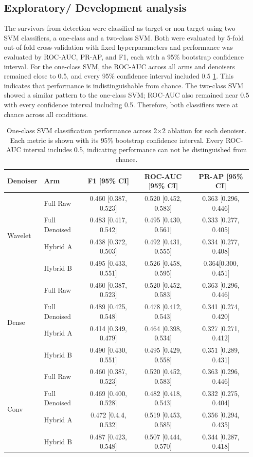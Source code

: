 \documentclass[ %
                    author={Daniel Page},
                supervisor={Dr. Andrew Calway},
                    degree={MSc},
                     title={Some Structural Guidelines for Data Science MSc Theses, Including Those With Long Titles that Run Across Multiple Lines on the Front Page},
                  subtitle={And those including an optional subtitle too, for good measure},
                      type={},
                      year={2021}]{dissertation}
\begin{document}
\subsection{Exploratory/ Development analysis}
The survivors from detection were classified as target or non-target using two SVM classifiers, a one-class and a two-class SVM. Both were evaluated by 5-fold out-of-fold cross-validation with fixed hyperparameters and performance was evaluated by ROC-AUC, PR-AP, and F1, each with a 95\% bootstrap confidence interval.  
For the one-class SVM, the ROC-AUC across all arms and denoisers remained close to 0.5, and every 95\% confidence interval included 0.5 \ref{tab:oneclass-cis}. This indicates that performance is indistinguishable from chance. 
The two-class SVM showed a similar pattern to the one-class SVM; ROC-AUC also remained near 0.5 with every confidence interval including 0.5. Therefore, both classifiers were at chance across all conditions. 
\begin{table}[htbp]
    \centering
    \small
    \begin{tabular}{llccc}
    \toprule
    Denoiser  & Arm & F1 [95\% CI] & ROC-AUC [95\% CI] & PR-AP [95\% CI] \\
    \midrule
    \multirow{4}{*}{Wavelet}
    & Full Raw & 0.460 [0.387, 0.523] & 0.520 [0.452, 0.583] & 0.363 [0.296, 0.446] \\
    & Full Denoised & 0.483 [0.417, 0.542] & 0.495 [0.430, 0.561] & 0.333 [0.277, 0.405] \\
    & Hybrid A & 0.438 [0.372, 0.503] & 0.492 [0.431, 0.555] & 0.334 [0.277, 0.408] \\
    & Hybrid B & 0.495 [0.433, 0.551] & 0.526 [0.458, 0.595] & 0.364[0.300, 0.451] \\
    \midrule
    \multirow{4}{*}{Dense}
    & Full Raw & 0.460 [0.387, 0.523] & 0.520 [0.452, 0.583] & 0.363 [0.296, 0.446] \\
    & Full Denoised & 0.489 [0.425, 0.548] & 0.478 [0.412, 0.543] & 0.341 [0.274, 0.420] \\
    & Hybrid A & 0.414 [0.349, 0.479] & 0.464 [0.398, 0.534] & 0.327 [0.271, 0.412] \\
    & Hybrid B & 0.490 [0.430, 0.551] & 0.495 [0.429, 0.558] & 0.351 [0.289, 0.431] \\
    \midrule
    \multirow{4}{*}{Conv}
    & Full Raw & 0.460 [0.387, 0.523] & 0.520 [0.452, 0.583] & 0.363 [0.296, 0.446] \\
    & Full Denoised & 0.469 [0.400, 0.528] & 0.482 [0.418, 0.543] & 0.332 [0.275, 0.404] \\
    & Hybrid A & 0.472 [0.4.4, 0.532] & 0.519 [0.453, 0.585] & 0.356 [0.294, 0.435] \\
    & Hybrid B & 0.487 [0.423, 0.548] & 0.507 [0.444, 0.570] & 0.344 [0.287, 0.418] \\ 
    \bottomrule
    \end{tabular}
    \caption{One-class SVM classification performance across 2$\times$2 ablation for each denoiser. Each metric is shown with its 95\% bootstrap confidence interval. Every ROC-AUC interval includes 0.5, indicating performance can not be distinguished from chance.} 
    \label{tab:oneclass-cis}
\end{table}
\end{document}
